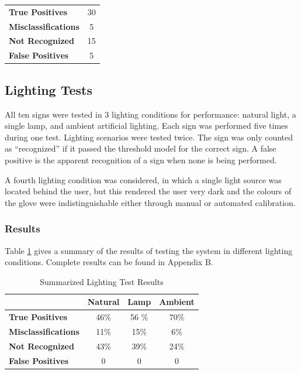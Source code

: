 \documentclass[12pt]{article}
\begin{document}
\begin{table}[h]
\begin{tabular}{l c}
\textbf{True Positives} & 30 \\
\textbf{Misclassifications} & 5 \\
\textbf{Not Recognized} & 15 \\
\textbf{False Positives} & 5 \\

\end{tabular}

\end{table}

\subsection{Lighting Tests}
All ten signs were tested in 3 lighting conditions for performance: natural light, a single lamp, and ambient artificial lighting. Each sign was performed five times during one test. Lighting scenarios were tested twice. The sign was only counted as “recognized” if it passed the threshold model for the correct sign. A false positive is the apparent recognition of a sign when none is being performed. 

A fourth lighting condition was considered, in which a single light source was located behind the user, but this rendered the user very dark and the colours of the glove were indistinguishable either through manual or automated calibration.

\subsubsection{Results}
Table \ref{light} gives a summary of the results of testing the system in different lighting conditions. Complete results can be found in Appendix B.

\begin{table}[h]
\centering
\caption{Summarized Lighting Test Results}
\label{light}
\begin{tabular}{|l|c|c|c|}

\hline
 & \textbf{Natural} & \textbf{Lamp} & \textbf{Ambient} \\ \hline
\textbf{True Positives} & 46\% & 56 \% & 70\% \\ \hline
\textbf{Misclassifications} & 11\% & 15\% & 6\% \\ \hline
\textbf{Not Recognized} & 43\% & 39\% & 24\% \\ \hline
\textbf{False Positives} & 0 & 0 & 0 \\ \hline

\end{tabular}

\end{table}
\end{document}
